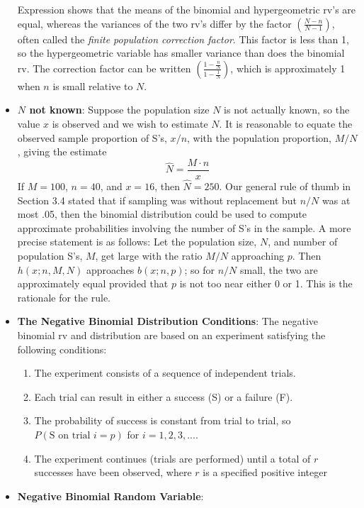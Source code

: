 \documentclass{report}
\begin{document}
\begin{itemize}
        Expression shows that the means of the binomial and hypergeometric rv's are equal, whereas the variances of the two rv's differ by the factor $\left( \frac{N - n}{N - 1} \right)$, often called the \textit{finite population correction factor}. This factor is less than 1, so the
        hypergeometric variable has smaller variance than does the binomial rv. The
        correction factor can be written $\left(\frac{1-\frac{n}{N}}{1-\frac{1}{N}}\right) $, which is approximately 1
        when $n$ is small relative to $N$.
    \item \textbf{$N$ not known}:
        Suppose the population size $N$ is not actually known, so the value $x$ is observed and we wish to estimate $N$. It is reasonable to equate the observed sample proportion of S's, $x/n$, with the population proportion, $M/N$, giving the estimate
        \[
            \hat{N} = \frac{M \cdot n}{x}
        \]
        If $M = 100$, $n = 40$, and $x = 16$, then $\hat{N} = 250$.
        \bigbreak \noindent 
        Our general rule of thumb in Section 3.4 stated that if sampling was without replacement but $n/N$ was at most .05, then the binomial distribution could be used to compute approximate probabilities involving the number of S's in the sample. A more precise statement is as follows: Let the population size, $N$, and number of population S's, $M$, get large with the ratio $M/N$ approaching $p$. Then $h(x; n, M, N)$ approaches $b(x; n, p)$; so for $n/N$ small, the two are approximately equal provided that $p$ is not too near either 0 or 1. This is the rationale for the rule.
    \item \textbf{The Negative Binomial Distribution Conditions}:
        The negative binomial rv and distribution are based on an experiment satisfying the following conditions:
        \begin{enumerate}
            \item The experiment consists of a sequence of independent trials.
            \item Each trial can result in either a success (S) or a failure (F).
            \item The probability of success is constant from trial to trial, so $P(\text{S on trial $i$} = p) $ for $i=1,2,3,... $.
            \item The experiment continues (trials are performed) until a total of $r$ successes have been observed, where $r$ is a specified positive integer
        \end{enumerate}
    \item \textbf{Negative Binomial Random Variable}:

\end{itemize}
\end{document}
